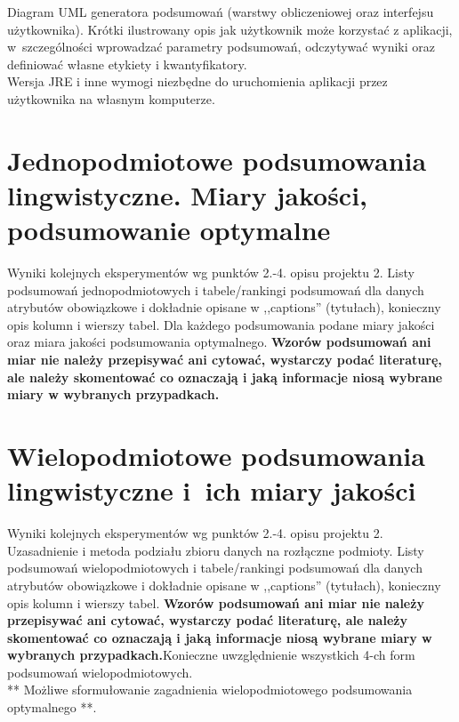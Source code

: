 \documentclass{classrep}
\begin{document}
Diagram UML generatora podsumowań (warstwy obliczeniowej oraz interfejsu
użytkownika). Krótki ilustrowany opis jak użytkownik może korzystać z aplikacji, w~szczególności
wprowadzać parametry  podsumowań, odczytywać wyniki oraz definiować własne etykiety i
kwantyfikatory.\\

Wersja JRE i inne wymogi niezbędne do uruchomienia aplikacji przez użytkownika na własnym komputerze. 

\section{ Jednopodmiotowe podsumowania lingwistyczne. Miary jakości, podsumowanie optymalne}
Wyniki kolejnych eksperymentów wg punktów 2.-4. opisu projektu 2.  Listy podsumowań
jednopodmiotowych i tabele/rankingi podsumowań dla danych atrybutów obowiązkowe i dokładnie opisane w ,,captions'' (tytułach), konieczny opis kolumn i wierszy tabel. Dla każdego podsumowania podane miary jakości oraz miara jakości podsumowania
optymalnego. {\bf Wzorów podsumowań ani miar nie należy przepisywać ani cytować, wystarczy podać literaturę, ale
należy skomentować co oznaczają i jaką informacje niosą wybrane miary w wybranych
przypadkach.}\\

\section{Wielopodmiotowe podsumowania lingwistyczne i~ich miary jakości} 
Wyniki kolejnych eksperymentów wg punktów 2.-4. opisu projektu 2. Uzasadnienie i
metoda podziału zbioru danych na rozłączne podmioty. Listy podsumowań
wielopodmiotowych i tabele/rankingi podsumowań dla danych atrybutów obowiązkowe i
dokładnie opisane w ,,captions'' (tytułach), konieczny opis kolumn i wierszy tabel.
{\bf Wzorów podsumowań ani miar nie należy przepisywać ani cytować, wystarczy podać literaturę, ale
należy skomentować co oznaczają i jaką informacje niosą wybrane miary w wybranych
przypadkach.}Konieczne uwzględnienie wszystkich 4-ch form podsumowań wielopodmiotowych. 
\\ 

** Możliwe sformułowanie zagadnienia wielopodmiotowego podsumowania optymalnego **.\\
\\
\end{document}
